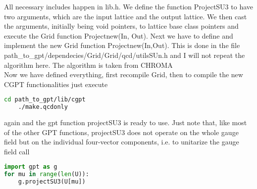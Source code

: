 \documentclass[a4paper,10pt]{scrartcl}
\begin{document}
All necessary includes happen in lib.h. We define the function ProjectSU3 to have two arguments, which are the input lattice and the output lattice. We then cast the arguments,
initially being void pointers, to lattice base class pointers and execute the Grid function Projectnew(In, Out). Next we have to define and implement the new Grid function Projectnew(In,Out).
This is done in the file path\_to\_gpt/dependecies/Grid/Grid/qcd/utilsSUn.h and I will not repeat the algorithm here. The algorithm is taken from CHROMA \\
Now we have defined everything, first recompile Grid, then to compile the new CGPT functionalities just execute
\begin{lstlisting}[language=bash]
    cd path_to_gpt/lib/cgpt
    ./make.qcdonly
\end{lstlisting}
again and the gpt function projectSU3 is ready to use. Just note that, like most of the other GPT functions, projectSU3 does not operate on the whole
gauge field but on the individual four-vector components, i.e. to unitarize the gauge field call
\begin{lstlisting}[language=python]
import gpt as g
for mu in range(len(U)):
    g.projectSU3(U[mu])
\end{lstlisting}
\end{document}
